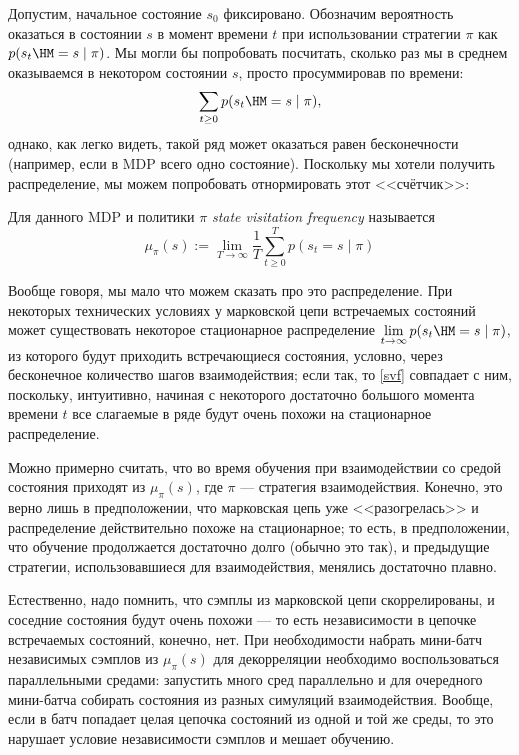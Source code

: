 Допустим, начальное состояние $s_0$ фиксировано. Обозначим вероятность оказаться в состоянии $s$ в момент времени $t$ при использовании стратегии $\pi$ как $p(s_t \HM= s \mid \pi)$. Мы могли бы попробовать посчитать, сколько раз мы в среднем оказываемся в некотором состоянии $s$, просто просуммировав по времени:
$$\sum_{t \ge 0} p(s_t \HM= s \mid \pi),$$
однако, как легко видеть, такой ряд может оказаться равен бесконечности (например, если в MDP всего одно состояние). Поскольку мы хотели получить распределение, мы можем попробовать отнормировать этот <<счётчик>>:

\begin{definition} 
Для данного MDP и политики $\pi$ \emph{state visitation frequency} называется
\begin{equation}\label{svf}
\mu_\pi(s) := \lim_{T \to \infty} \frac{1}{T} \sum_{t \ge 0}^T p(s_t = s \mid \pi)
\end{equation}
\end{definition}

Вообще говоря, мы мало что можем сказать про это распределение. При некоторых технических условиях у марковской цепи встречаемых состояний может существовать некоторое стационарное распределение $\lim\limits_{t \to \infty} p(s_t \HM= s \mid \pi)$, из которого будут приходить встречающиеся состояния, условно, через бесконечное количество шагов взаимодействия; если так, то \eqref{svf} совпадает с ним, поскольку, интуитивно, начиная с некоторого достаточно большого момента времени $t$ все слагаемые в ряде будут очень похожи на стационарное распределение.

Можно примерно считать, что во время обучения при взаимодействии со средой состояния приходят из $\mu_{\pi}(s)$, где $\pi$ --- стратегия взаимодействия. Конечно, это верно лишь в предположении, что марковская цепь уже <<разогрелась>> и распределение действительно похоже на стационарное; то есть, в предположении, что обучение продолжается достаточно долго (обычно это так), и предыдущие стратегии, использовавшиеся для взаимодействия, менялись достаточно плавно. 

Естественно, надо помнить, что сэмплы из марковской цепи скоррелированы, и соседние состояния будут очень похожи --- то есть независимости в цепочке встречаемых состояний, конечно, нет. При необходимости набрать мини-батч независимых сэмплов из $\mu_{\pi}(s)$ для декорреляции необходимо воспользоваться параллельными средами: запустить много сред параллельно и для очередного мини-батча собирать состояния из разных симуляций взаимодействия. Вообще, если в батч попадает целая цепочка состояний из одной и той же среды, то это нарушает условие независимости сэмплов и мешает обучению. 

